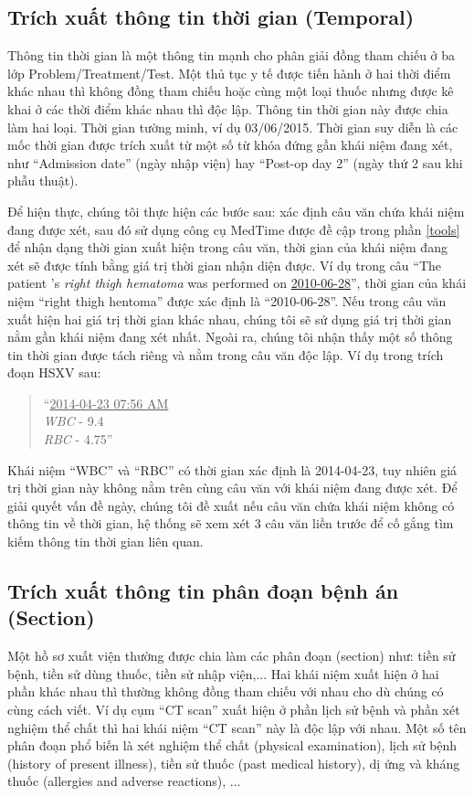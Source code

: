 \subsection*{Trích xuất thông tin thời gian (Temporal)}
Thông tin thời gian là một thông tin mạnh cho phân giải đồng tham chiếu ở ba lớp Problem/Treatment/Test. Một thủ tục y tế được tiến hành ở hai thời điểm khác nhau thì không đồng tham chiếu hoặc cùng một loại thuốc nhưng được kê khai ở các thời điểm khác nhau thì độc lập. Thông tin thời gian này được chia làm hai loại. Thời gian tường minh, ví dụ 03/06/2015. Thời gian suy diễn là các mốc thời gian được trích xuất từ một số từ khóa đứng gần khái niệm đang xét, như ``Admission date'' (ngày nhập viện) hay ``Post-op day 2'' (ngày thứ 2 sau khi phẫu thuật).

Để hiện thực, chúng tôi thực hiện các bước sau: xác định câu văn chứa khái niệm đang được xét, sau đó sử dụng công cụ MedTime được đề cập trong phần \ref{tools} để nhận dạng thời gian xuất hiện trong câu văn, thời gian của khái niệm đang xét sẽ được tính bằng giá trị thời gian nhận diện được. Ví dụ trong câu ``The patient 's \textit{right thigh hematoma} was performed on \underline{2010-06-28}'', thời gian của khái niệm ``right thigh hentoma'' được xác định là ``2010-06-28''. Nếu trong câu văn xuất hiện hai giá trị thời gian khác nhau, chúng tôi sẽ sử dụng giá trị thời gian nằm gần khái niệm đang xét nhất. Ngoài ra, chúng tôi nhận thấy một số thông tin thời gian được tách riêng và nằm trong câu văn độc lập. Ví dụ trong trích đoạn HSXV sau:

\begin{quote}
``\underline{2014-04-23 07:56 AM}\\
\textit{WBC} - 9.4\\
\textit{RBC} - 4.75''
\end{quote}

Khái niệm ``WBC'' và ``RBC'' có thời gian xác định là 2014-04-23, tuy nhiên giá trị thời gian này không nằm trên cùng câu văn với khái niệm đang được xét. Để giải quyết vấn đề ngày, chúng tôi đề xuất nếu câu văn chứa khái niệm không có thông tin về thời gian, hệ thống sẽ xem xét 3 câu văn liền trước để cố gắng tìm kiếm thông tin thời gian liên quan.

\subsection*{Trích xuất thông tin phân đoạn bệnh án (Section)}
Một hồ sơ xuất viện thường được chia làm các phân đoạn (section) như: tiền sử bệnh, tiền sử dùng thuốc, tiền sử nhập viện,... Hai khái niệm xuất hiện ở hai phần khác nhau thì thường không đồng tham chiếu với nhau cho dù chúng có cùng cách viết. Ví dụ cụm “CT scan” xuất hiện ở phần lịch sử bệnh và phần xét nghiệm thể chất thì hai khái niệm “CT scan” này là độc lập với nhau. Một số tên phân đoạn phổ biến là xét nghiệm thể chất (physical examination), lịch sử bệnh (history of present illness), tiền sử thuốc (past medical history), dị ứng và kháng thuốc (allergies and adverse reactions), ...

